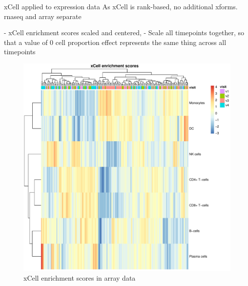 xCell applied to expression data 
As xCell is rank-based, no additional xforms.
rnaseq and array separate

- xCell enrichment scores scaled and centered, 
- Scale all timepoints together, so that a value of 0 cell proportion effect represents the same thing across all timepoints

\begin{figure}
    \centering
    \includegraphics[width=1.0\textwidth,page=1]{mainmatter/figures/chapter_03/get_xCell_estimates.dataset_array.plots.pdf}
    \caption{xCell enrichment scores in array data}
    \label{fig:hird_xCell_scores_heatmap_array}
\end{figure}

